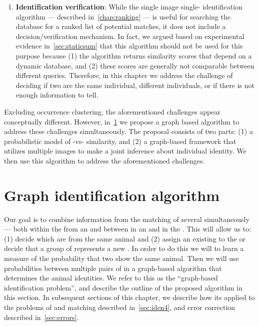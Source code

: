 \begin{enumerate}
        \item \textbf{Identification verification}:
            While the single image single-\annot{} identification algorithm
              --- described in~\cref{chap:ranking} --- is useful for searching
              the database for a ranked list of potential matches, it does not
              include a decision/verification mechanism.
            In fact, we argued based on experimental evidence
              in~\cref{sec:staticsum} that this algorithm should not be used for
              this purpose because
            (1) the algorithm returns similarity scores that depend on a
              dynamic database, and
            (2) these scores are generally not comparable between different
              queries.
            Therefore, in this chapter we address the challenge of deciding if
              two \annots{} are the same individual, different individuals, or
              if there is not enough information to tell.
    \end{enumerate}

    Excluding occurrence clustering, the aforementioned challenges appear
      conceptually different.
    However, in~\cref{sec:geniden} we propose a graph based algorithm to
      address these challenges simultaneously.
    The proposal consists of two parts:
    (1) a probabilistic model of \annot{}-vs-\annot{} similarity, and
    (2) a graph-based framework that utilizes multiple images to make a joint
      inference about individual identity.
    We then use this algorithm to address the aforementioned challenges.

\section{Graph identification algorithm}\label{sec:geniden}

    Our goal is to combine information from the matching of several \annots{}
      simultaneously --- both within the \annots{} from an \occurrence{} and
      between \annots{} in an \occurrence{} and \annots{} in the
      \masterdatabase{}.
    This will allow us to:
    (1) decide which \annots{} are from the same animal and
    (2) assign an existing \name{} to the \annots{} or decide that a group of
      \annots{} represents a new \name{}.
    In order to do this we will to learn a measure of the probability that two
      \annots{} show the same animal.
    Then we will use probabilities between multiple pairs of \annots{} in a
      graph-based algorithm that determines the animal identities.
    We refer to this as the ``graph-based identification problem'', and
      describe the outline of the proposed algorithm in this section.
    In subsequent sections of this chapter, we describe how its applied to the
      problems of \intraoccurrence{} and \vsexemplar{} matching described
      in~\cref{sec:iden4}, and error correction described in~\cref{sec:errors}.

